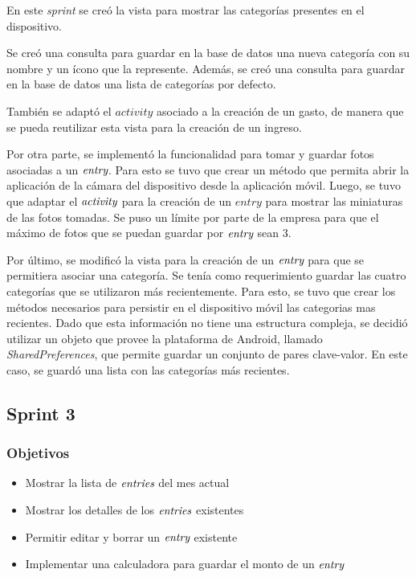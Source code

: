 En este \textit{sprint} se creó la vista para mostrar las categorías presentes en el dispositivo.

Se creó una consulta para guardar en la base de datos una nueva categoría con su nombre y un ícono que la represente. Además, se creó una consulta para guardar en la base de datos una lista de categorías por defecto.

También se adaptó el $activity$ asociado a la creación de un gasto, de manera que se pueda reutilizar esta vista para la creación de un ingreso. 

Por otra parte, se implementó la funcionalidad para tomar y guardar fotos asociadas a un $\textit{entry}$. Para esto se tuvo que crear un método que permita abrir la aplicación de la cámara del dispositivo desde la aplicación móvil. Luego, se tuvo que adaptar el $\textit{activity}$ para la creación de un $entry$ para mostrar las miniaturas de las fotos tomadas. Se puso un límite por parte de la empresa para que el máximo de fotos que se puedan guardar por $\textit{entry}$ sean 3.

Por último, se modificó la vista para la creación de un $\textit{entry}$ para que se permitiera asociar una categoría. Se tenía como requerimiento guardar las cuatro categorías que se utilizaron más recientemente. Para esto, se tuvo que crear los métodos necesarios para persistir en el dispositivo móvil las categorias mas recientes. Dado que esta información no tiene una estructura compleja, se decidió utilizar un objeto que provee la plataforma de Android, llamado \textit{SharedPreferences}, que permite guardar un conjunto de pares clave-valor. En este caso, se guardó una lista con las categorías más recientes.



\subsection{Sprint 3}
\subsubsection{Objetivos}
\begin{itemize}
\item Mostrar la lista de $\textit{entries}$ del mes actual
\item Mostrar los detalles de los $\textit{entries}$ existentes
\item Permitir editar y borrar un $\textit{entry}$ existente
\item Implementar una calculadora para guardar el monto de un $\textit{entry}$
\end{itemize}

